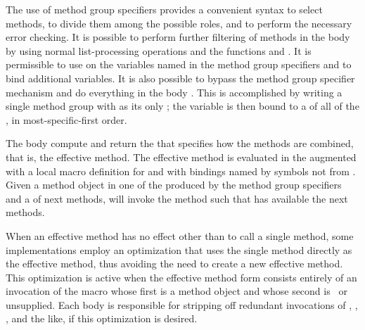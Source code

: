 \endlist
 
The use of method group specifiers provides a convenient syntax to
select methods, to divide them among the possible roles, and to perform the
necessary error checking.  It is possible to perform further filtering
of methods in the body  by using normal list-processing operations
and the functions  and 
.  It is permissible to use  on the
variables named in the method group specifiers and to bind additional
variables.  It is also possible to bypass the method group specifier
mechanism and do everything in the body .  This is accomplished
by writing a single method group with \misc{*} as its only 
; 
the variable is then bound to a  of all of the
, in most-specific-first order.
 
 
The body  compute and return the  that specifies
how the methods are combined, that is, the effective method.
The effective method is evaluated in
the  augmented with a local macro definition
for  and with bindings named by
symbols not  from .
Given a method object in one of the 
 produced by the method group
specifiers and a  of next methods,
will invoke the method such that  has available
the next methods.
 
When an effective method has no effect other than to call a single
method, some implementations employ an optimization that uses the
single method directly as the effective method, thus avoiding the need
to create a new effective method.  This optimization is active when
the effective method form consists entirely of an invocation of
the  macro whose first  is a method object and
whose second  is \nil\ or unsupplied.  Each
 body is responsible for stripping off
redundant invocations of , ,
, and the like, if this optimization is desired.
 
 
 
